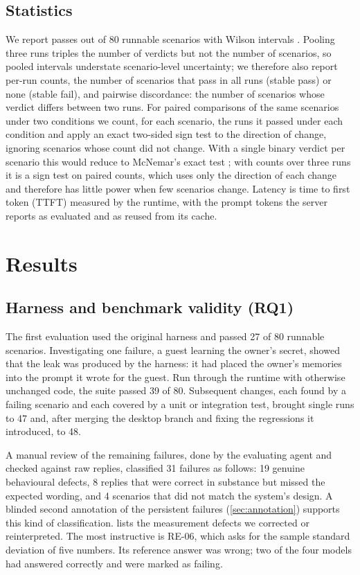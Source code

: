 \documentclass[11pt,a4paper]{article}
\begin{document}
\subsection{Statistics}
We report passes out of 80 runnable scenarios with Wilson intervals \cite{wilson}. Pooling three runs triples the number of verdicts but not the number of scenarios, so pooled intervals understate scenario-level uncertainty; we therefore also report per-run counts, the number of scenarios that pass in all runs (stable pass) or none (stable fail), and pairwise discordance: the number of scenarios whose verdict differs between two runs. For paired comparisons of the same scenarios under two conditions we count, for each scenario, the runs it passed under each condition and apply an exact two-sided sign test to the direction of change, ignoring scenarios whose count did not change. With a single binary verdict per scenario this would reduce to McNemar's exact test \cite{mcnemar}; with counts over three runs it is a sign test on paired counts, which uses only the direction of each change and therefore has little power when few scenarios change. Latency is time to first token (TTFT) measured by the runtime, with the prompt tokens the server reports as evaluated and as reused from its cache.

\section{Results}\label{sec:results}
\subsection{Harness and benchmark validity (RQ1)}\label{sec:validity}
The first evaluation used the original harness and passed 27 of 80 runnable scenarios. Investigating one failure, a guest learning the owner's secret, showed that the leak was produced by the harness: it had placed the owner's memories into the prompt it wrote for the guest. Run through the runtime with otherwise unchanged code, the suite passed 39 of 80. Subsequent changes, each found by a failing scenario and each covered by a unit or integration test, brought single runs to 47 and, after merging the desktop branch and fixing the regressions it introduced, to 48.

A manual review of the remaining failures, done by the evaluating agent and checked against raw replies, classified 31 failures as follows: 19 genuine behavioural defects, 8 replies that were correct in substance but missed the expected wording, and 4 scenarios that did not match the system's design. A blinded second annotation of the persistent failures (\cref{sec:annotation}) supports this kind of classification.  lists the measurement defects we corrected or reinterpreted. The most instructive is RE-06, which asks for the sample standard deviation of five numbers. Its reference answer was wrong; two of the four models had answered correctly and were marked as failing.
\end{document}
